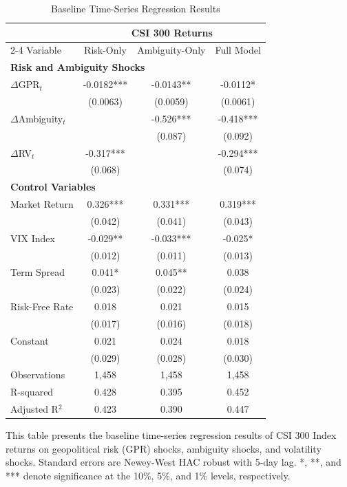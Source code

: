 \documentclass[preprint,12pt,authoryear]{elsarticle}
\begin{document}
\begin{table}[htbp]
\centering
\caption{Baseline Time-Series Regression Results}
\label{tab:baseline_ts}
\begin{threeparttable}
\begin{tabular*}{\textwidth}{@{\extracolsep{\fill}} lccc @{\extracolsep{\fill}}}
\toprule
& \multicolumn{3}{c}{CSI 300 Returns} \\
\cmidrule(lr){2-4}
Variable & Risk-Only & Ambiguity-Only & Full Model \\
\midrule
\midrule
\multicolumn{4}{l}{\textbf{Risk and Ambiguity Shocks}} \\
$\Delta$GPR$_t$ & -0.0182*** & -0.0143** & -0.0112* \\
& (0.0063) & (0.0059) & (0.0061) \\
$\Delta$Ambiguity$_t$ &  & -0.526*** & -0.418*** \\
&  & (0.087) & (0.092) \\
$\Delta$RV$_t$ & -0.317*** &  & -0.294*** \\
& (0.068) &   & (0.074) \\
\midrule
\multicolumn{4}{l}{\textbf{Control Variables}} \\
Market Return & 0.326*** & 0.331*** & 0.319*** \\
& (0.042) & (0.041) & (0.043) \\
VIX Index & -0.029** & -0.033*** & -0.025* \\
& (0.012) & (0.011) & (0.013) \\
Term Spread & 0.041* & 0.045** & 0.038 \\
& (0.023) & (0.022) & (0.024) \\
Risk-Free Rate & 0.018 & 0.021 & 0.015 \\
& (0.017) & (0.016) & (0.018) \\
\midrule
Constant & 0.021 & 0.024 & 0.018 \\
& (0.029) & (0.028) & (0.030) \\
\midrule
Observations & 1,458 & 1,458 & 1,458 \\
R-squared & 0.428 & 0.395 & 0.452 \\
Adjusted R$^2$ & 0.423 & 0.390 & 0.447 \\
\bottomrule
\end{tabular*}
\begin{tablenotes}[flushleft]
\small
\item[] This table presents the baseline time-series regression results of CSI 300 Index returns on geopolitical risk (GPR) shocks, ambiguity shocks, and volatility shocks. Standard errors are Newey-West HAC robust with 5-day lag. *, **, and *** denote significance at the 10\%, 5\%, and 1\% levels, respectively.
\end{tablenotes}
\end{threeparttable}
\end{table}
\end{document}
